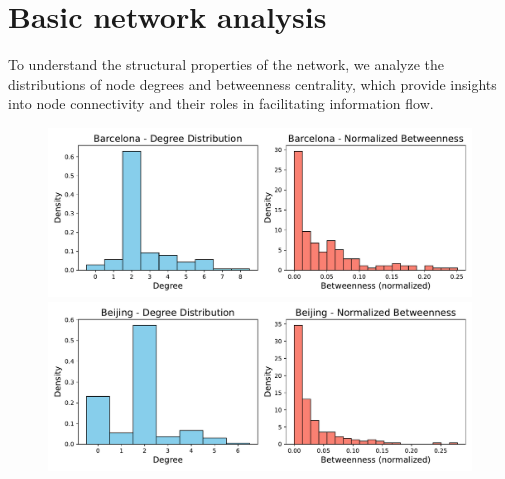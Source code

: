  
\newpage
\section{Basic network analysis}
To understand the structural properties of the network, we analyze the distributions of node degrees and betweenness centrality, which provide insights into node connectivity and their roles in facilitating information flow.
\begin{figure}[hbtp]
    \centering
    \begin{minipage}{0.48\linewidth}
        \centering
        \includegraphics[width=\linewidth]{figures/task40_plots/deg_bet_Barcelona.pdf}
        \end{minipage}%
    \hfill
    \begin{minipage}{0.48\linewidth}
        \centering
        \includegraphics[width=\linewidth]{figures/task40_plots/deg_bet_Beijing.pdf}
    \end{minipage}
\end{figure}

